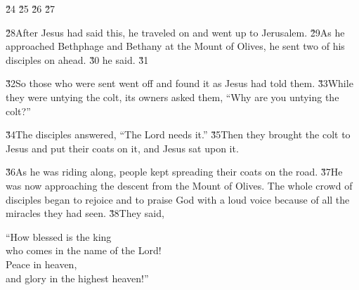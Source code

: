 \v{24} \v{25} \v{26} \v{27}

\v{28}After Jesus had said this, he traveled on and went up to Jerusalem. \v{29}As he approached Bethphage and Bethany at the Mount of Olives, he sent two of his disciples on ahead. \v{30} he said.  \v{31}

\v{32}So those who were sent went off and found it as Jesus had told them. \v{33}While they were untying the colt, its owners asked them, ``Why are you untying the colt?''

\v{34}The disciples answered, ``The Lord needs it.'' \v{35}Then they brought the colt to Jesus and put their coats on it, and Jesus sat upon it.

\v{36}As he was riding along, people kept spreading their coats on the road. \v{37}He was now approaching the descent from the Mount of Olives. The whole crowd of disciples began to rejoice and to praise God with a loud voice because of all the miracles they had seen. \v{38}They said,

\begin{poetry}
\poeml ``How blessed is the king \\
\poemll    who comes in the name of the Lord! \\
\poeml Peace in heaven, \\
\poemll    and glory in the highest heaven!''
\end{poetry}

